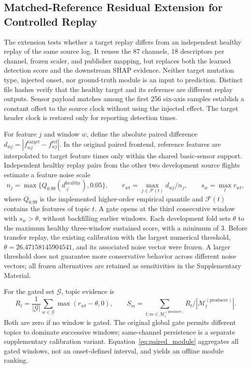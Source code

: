 \subsection{Matched-Reference Residual Extension for Controlled Replay}
\label{sec:paired_replay_method}

The extension tests whether a target replay differs from an independent healthy replay of the same source log. It reuses the 87 channels, 18 descriptors per channel, frozen scaler, and publisher mapping, but replaces both the learned detection score and the downstream SHAP evidence. Neither target mutation type, injected onset, nor ground-truth module is an input to prediction. Distinct file hashes verify that the healthy target and its reference are different replay outputs. Sensor payload matches among the first 256 six-axis samples establish a constant offset to the source clock without using the injected effect. The target header clock is restored only for reporting detection times.

For feature $j$ and window $w$, define the absolute paired difference $d_{wj}=|f^{\mathrm{target}}_{wj}-f^{\mathrm{ref}}_{wj}|$. In the original paired frontend, reference features are interpolated to target feature times only within the shared basic-sensor support. Independent healthy replay pairs from the other two development source flights estimate a feature noise scale
\begin{equation}
n_j=\max\{Q_{0.99}(d^{\mathrm{healthy}}_{\cdot j}),0.05\},\qquad
r_{wt}=\max_{j\in\mathcal F(t)}d_{wj}/n_j,\qquad s_w=\max_t r_{wt},
\label{eq:paired_residual}
\end{equation}
where $Q_{0.99}$ is the implemented higher-order empirical quantile and $\mathcal F(t)$ contains the features of topic $t$. A gate opens at the third consecutive window with $s_w>\theta$, without backfilling earlier windows. Each development fold sets $\theta$ to the maximum healthy three-window sustained score, with a minimum of 3. Before transfer replay, the existing calibration with the largest numerical threshold, $\theta=26.47158145904541$, and its associated noise vector were frozen. A larger threshold does not guarantee more conservative behavior across different noise vectors; all frozen alternatives are retained as sensitivities in the Supplementary Material.

For the gated set $\mathcal G$, topic evidence is
\begin{equation}
R_t=\frac{1}{|\mathcal G|}\sum_{w\in\mathcal G}\max(r_{wt}-\theta,0),\qquad
S_m=\sum_{t:m\in\mathcal M_t^{(\mathrm{producer})}}R_t/|\mathcal M_t^{(\mathrm{producer})}|.
\label{eq:paired_module}
\end{equation}
Both are zero if no window is gated. The original global gate permits different topics to dominate successive windows; same-channel persistence is a separate supplementary calibration variant. Equation~\eqref{eq:paired_module} aggregates all gated windows, not an onset-defined interval, and yields an offline module ranking.

